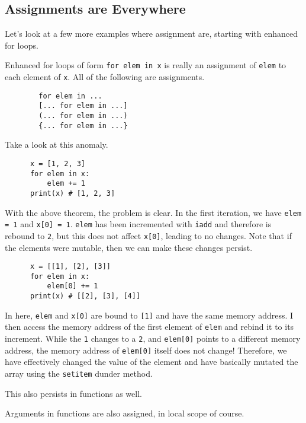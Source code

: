 \documentclass{article}
\begin{document}
  \subsection{Assignments are Everywhere}

    Let's look at a few more examples where assignment are, starting with enhanced for loops. 

    \begin{theorem}
      Enhanced for loops of form \texttt{for elem in x} is really an assignment of \texttt{elem} to each element of \texttt{x}. All of the following are assignments. 
      \begin{lstlisting}
        for elem in ... 
        [... for elem in ...]
        (... for elem in ...)
        {... for elem in ...}
      \end{lstlisting}
    \end{theorem}

    Take a look at this anomaly. 
    \begin{lstlisting}
      x = [1, 2, 3] 
      for elem in x: 
          elem += 1 
      print(x) # [1, 2, 3]
    \end{lstlisting}
    With the above theorem, the problem is clear. In the first iteration, we have \texttt{elem = 1} and \texttt{x[0] = 1}. \texttt{elem} has been incremented with \texttt{iadd} and therefore is rebound to \texttt{2}, but this does not affect \texttt{x[0]}, leading to no changes. Note that if the elements were mutable, then we can make these changes persist. 
    \begin{lstlisting}
      x = [[1], [2], [3]]
      for elem in x: 
          elem[0] += 1 
      print(x) # [[2], [3], [4]]
    \end{lstlisting}
    In here, \texttt{elem} and \texttt{x[0]} are bound to \texttt{[1]} and have the same memory address. I then access the memory address of the first element of \texttt{elem} and rebind it to its increment. While the \texttt{1} changes to a \texttt{2}, and \texttt{elem[0]} points to a different memory address, the memory address of \texttt{elem[0]} itself does not change! Therefore, we have effectively changed the value of the element and have basically mutated the array using the \texttt{setitem} dunder method. 
    
    This also persists in functions as well. 

    \begin{theorem}
      Arguments in functions are also assigned, in local scope of course.  
    \end{theorem}
\end{document}
